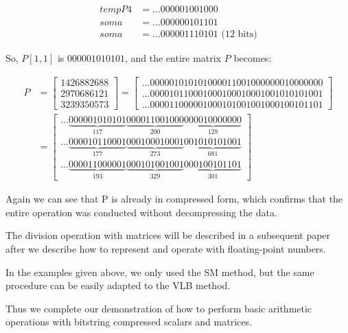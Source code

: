 \documentclass[12pt]{article}
\begin{document}
\begin{align*}
 tempP4&= \ldots000001001000 \\
 soma&=   \ldots000000101101 \\
 soma&=   \ldots000001110101 \text{ (12 bits)}
\end{align*}

So, $P[1,1]$ is $000001010101$, and the entire matrix $P$ becomes:


\begin{align}
	P &= \begin{bmatrix}
			1426882688\\ 
			2970686121\\ 
			3239350573
		\end{bmatrix} 
        =
        \begin{bmatrix}
   			\ldots000001010101000011001000000010000000 \\
			\ldots000010110001000100010001001010101001\\
			\ldots000011000001000101001001000100101101
		\end{bmatrix}
      \\ \nonumber
        &=        \begin{bmatrix}
\ldots\underbrace{000001010101}_{117}\underbrace{000011001000}_{200}\underbrace{
000010000000}_{128}\\
\ldots\underbrace{000010110001}_{177}\underbrace{000100010001}_{273}\underbrace{
001010101001}_{681}\\
\ldots\underbrace{000011000001}_{193}\underbrace{000101001001}_{329}\underbrace{
000100101101}_{301} 			 
        \end{bmatrix}
\end{align}

Again we can see that P is already in compressed form, which confirms that the
entire operation was conducted without decompressing the data.

The division operation with matrices will be described in a subsequent paper
after we describe how to represent and operate with floating-point numbers.

In the examples given above, we only used the SM method, but the same procedure
can be easily adapted to the VLB method.

Thus we complete our demonstration of how to perform basic arithmetic
operations with bitstring compressed scalars and matrices.


\end{document}
